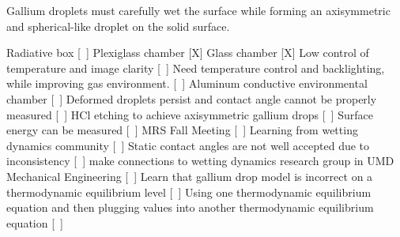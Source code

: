 Gallium droplets must carefully wet the surface while forming an axisymmetric and spherical-like droplet on the solid surface. 

\begin{outline}[enumerate]
	\1 Radiative box [~]
		\2 Plexiglass chamber [X]
		\2 Glass chamber [X]
		\2 Low control of temperature and image clarity [~]
			\3 Need temperature control and backlighting, while improving gas environment. [~]
	\1 Aluminum conductive environmental chamber [~]
		\2 Deformed droplets persist and contact angle cannot be properly measured [~]
		\2 HCl etching to achieve axisymmetric gallium drops [~]
		\2 Surface energy can be measured [~]
	\1 MRS Fall Meeting [~]
		\2 Learning from wetting dynamics community [~]
			\3 Static contact angles are not well accepted due to inconsistency  [~]
			\3 make connections to wetting dynamics research group in UMD Mechanical Engineering [~] 
			\3 Learn that gallium drop model is incorrect on a thermodynamic equilibrium level [~]
				\4 Using one thermodynamic equilibrium equation and then plugging values into another thermodynamic equilibrium equation [~]
		
\end{outline}

